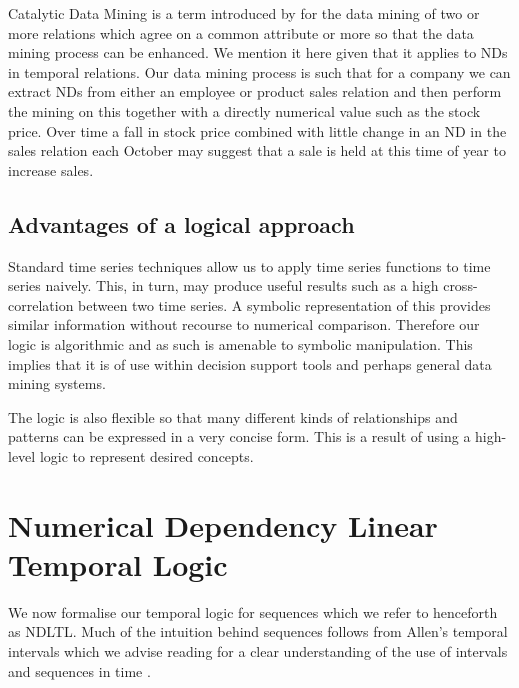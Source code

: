 Catalytic Data Mining is a term introduced by \cite{HS95} for the data
mining of two or more relations which agree on a common attribute or
more so that the data mining process can be enhanced. We mention it
here given that it applies to NDs in temporal relations. Our data
mining process is such that for a company we can extract NDs from
either an employee or product sales relation and 
then perform the mining on this together with a directly numerical
value such as the stock price. Over time a fall in stock price
combined with little change in an ND in the sales relation each
October may suggest that a sale is held at this time of year to
increase sales.

\subsection{Advantages of a logical approach}

Standard time series techniques allow us to apply time series functions
to time series naively. This, in turn, may produce useful results such
as a high cross-correlation between two time series. A symbolic
representation of this provides similar information without recourse
to numerical comparison. Therefore our logic is algorithmic and
as such is amenable to symbolic manipulation. This implies that it is
of use within decision support tools and perhaps general data mining
systems.

\medskip

The logic is also flexible so that many
different kinds of relationships and patterns can be expressed in a
very concise form. This is a result of using a high-level logic to
represent desired concepts. 


\section{Numerical Dependency Linear Temporal Logic}\label{sec:tl_ndltl}

We now formalise our temporal logic for sequences which we refer to
henceforth as NDLTL. Much of the intuition behind sequences follows
from Allen's temporal intervals which we advise reading for a clear
understanding of the use of intervals and sequences in time
\cite{all84}.

